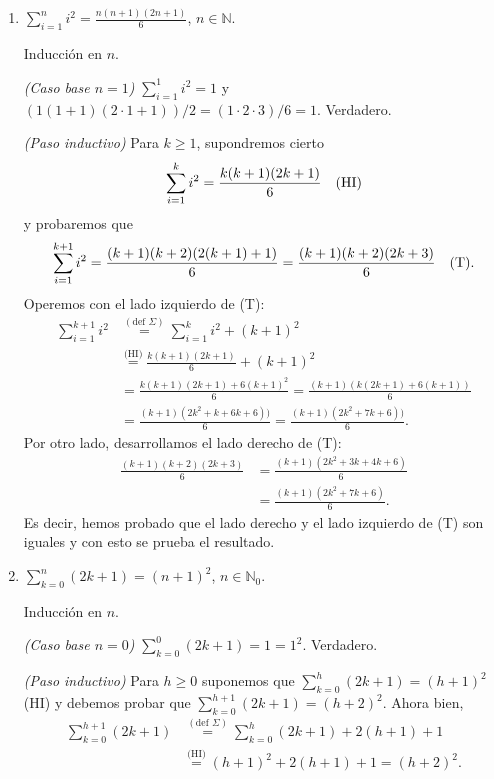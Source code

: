 \begin{enumerate}
\begin{enumerate}
        \item\label{ej-sum-i2}  $\displaystyle{ \sum_{i=1}^n i^2 = \frac{n(n+1)(2n+1)}{6}}$, $n\in \mathbb N$.
        
        \rta Inducción en $n$.
        
        \textit{(Caso base $n=1$) } $ \sum_{i=1}^1 i^2 = 1$ y $(1  (1+1)  (2\cdot 1 + 1))/2 = (1 \cdot 2 \cdot 3)/6=1$. Verdadero.  
        
        \textit{(Paso inductivo)} Para  $k \ge 1$,  supondremos cierto 
        $$\sum_{i=1}^{k} i^2 = \frac{k(k+1)(2k+1)}{6} \text{\quad (HI)}$$
        y probaremos que 
        $$\sum_{i=1}^{k+1} i^2 = \frac{(k+1)(k+2)(2(k+1)+1)}{6} = \frac{(k+1)(k+2)(2k+3)}{6} \text{\quad (T)}.$$ 
        Operemos con el lado izquierdo de (T):
        \begin{align*}
        \sum_{i=1}^{k+1} i^2 &\overset{(\text{def } \Sigma)}{=} \sum_{i=1}^{k} i^2 + (k+1)^2 \\ &\overset{\text{(HI)}}{=} \frac{k(k+1)(2k+1)}{6}  + (k+1)^2 \\ &=   \frac{k(k+1)(2k+1) + 6(k+1)^2}{6} = \frac{(k+1)(k(2k+1) + 6(k+1))}{6} \\ &= \frac{(k+1)(2k^2+k + 6k+6))}{6} =  \frac{(k+1)(2k^2+7k+6))}{6}.
        \end{align*}
        Por otro lado,  desarrollamos el lado derecho de (T): 
        \begin{align*}
            \frac{(k+1)(k+2)(2k+3)}{6} &= \frac{(k+1)(2k^2+3k +4k +6)}{6} \\&= \frac{(k+1)(2k^2+7k +6)}{6}.
        \end{align*}
        Es decir,  hemos probado que el lado derecho y el lado izquierdo de (T) son iguales y con esto se prueba el resultado. 
        
        \item  $\displaystyle{ \sum_{k=0}^n (2k+1) = (n+1)^2}$, $n\in \mathbb N_0$.
        
        \rta Inducción en $n$.
        
        \textit{(Caso base $n=0$) } $\sum_{k=0}^0 (2k+1) = 1 = 1^2$. Verdadero.
        
        \textit{(Paso inductivo)} Para $h \ge 0$ suponemos que $\sum_{k=0}^h (2k+1) = (h+1)^2$ (HI) y debemos probar que $\sum_{k=0}^{h+1} (2k+1) = (h+2)^2$. Ahora bien, 
        \begin{align*}
            \sum_{k=0}^{h+1} (2k+1) &\overset{(\text{def } \Sigma)}{=} \sum_{k=0}^h (2k+1) + 2(h+1) +1 \\ &\overset{\text{(HI)}}{=}  (h+1)^2 + 2(h+1) +1 = (h+2)^2.
        \end{align*}
        

\end{enumerate}
\end{enumerate}
